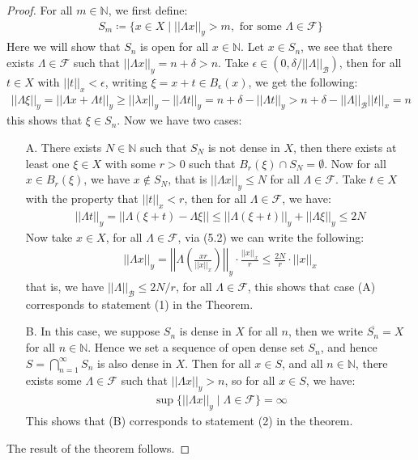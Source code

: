 \documentclass[11pt]{book}
\theoremstyle{break}
\theoremstyle{break}
\newcommand{\N}{\mathbb{N}}
\newcommand{\F}{\mathcal{F}}
\begin{document}
\begin{proof}
For all $m \in \N$, we first define:
\begin{align*}
S_m \coloneqq \{ x \in X \mid ||\Lambda x||_y >m, \text{ for some }\Lambda \in \F\}
\end{align*}
Here we will show that $S_n$ is open for all $x \in \N$. Let $x \in S_n$, we see that there exists $\Lambda  \in \F$ such that $||\Lambda x||_y = n + \delta > n$. Take $\epsilon \in (0, \delta / ||\Lambda||_{\mathcal{B}})$, then for all $t \in X$ with $||t||_x < \epsilon$, writing $\xi = x+t \in B_\epsilon(x)$, we get the following:
\begin{align*}
||\Lambda \xi||_y = ||\Lambda x + \Lambda t||_y \geq ||\lambda x||_y - ||\Lambda t||_y = n+\delta - ||\Lambda t||_y > n+ \delta - ||\Lambda ||_{\mathcal{B}}||t||_x  = n
\end{align*}
this shows that $\xi \in S_n$. Now we have two cases: 
\begin{enumerate}[topsep=3pt,itemsep=-1ex,partopsep=1ex,parsep=1ex]
\item[A.] There exists $N \in \N$ such that $S_N$ is not dense in $X$, then there exists at least one $\xi \in X$ with some $r >0$ such that $B_r(\xi)\cap S_N = \emptyset$. Now for all $x \in B_r(\xi)$, we have $x \notin S_N$, that is $||\Lambda x||_y \leq N$ for all $\Lambda \in \F$. Take $t \in X$ with the property that $||t||_x < r$, then for all $\Lambda \in \F$, we have: 
\begin{align}
||\Lambda t||_y =||\Lambda (\xi +t) - \Lambda \xi|| \leq ||\Lambda (\xi +t)||_y + ||\Lambda \xi||_y \leq 2N \end{align}
Now take $x \in X$, for all $\Lambda \in \F$, via (5.2) we can write the following:
\begin{align*}
||\Lambda x||_y = \left|\left|\Lambda \left(\frac{xr}{||x||_x}\right)\right|\right|_y \cdot \frac{||x||_x}{r} \leq \frac{2N}{r}\cdot ||x||_x
\end{align*}
that is, we have $||\Lambda||_{\mathcal{B}} \leq 2N/r$, for all $\Lambda \in \F$, this shows that case (A) corresponds to statement (1) in the Theorem.
\item[B.] In this case, we suppose $S_n$ is dense in $X$ for all $n$, then we write $\overline{S_n} = X$ for all $n \in \N$. Hence we set a sequence of open dense set $S_n$, and hence $S = \bigcap_{n=1}^\infty S_n$ is also dense in $X$. Then for all $x\in S$, and all $n \in \N$, there exists some $\Lambda \in \F$ such that $||\Lambda x||_y > n$, so for all $x \in S$, we have:
\begin{align*}
\sup\{ ||\Lambda x||_y \mid \Lambda \in \F\} = \infty
\end{align*}
This shows that (B) corresponds to statement (2) in the theorem. 
\end{enumerate}
The result of the theorem follows. 
\end{proof}
\end{document}
